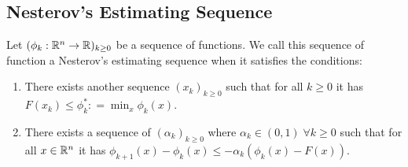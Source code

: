 \documentclass[12pt]{article}
\begin{document}
    \subsection{Nesterov's Estimating Sequence}
        \begin{definition}\label{def:nes-est-seq}
            Let $(\phi_k : \mathbb R^n \rightarrow\mathbb R)_{k \ge 0}$ be a sequence of functions. 
            We call this sequence of function a Nesterov's estimating sequence when it satisfies the conditions: 
            \begin{enumerate}
                \item There exists another sequence $(x_k)_{k \ge 0}$ such that for all $k \ge 0$ it has $F(x_k) \le \phi_k^*: =\min_{x}\phi_k(x)$. 
                \item There exists a sequence of $(\alpha_k)_{k \ge 0}$ where $\alpha_k \in (0, 1)\; \forall k \ge0 $ such that for all $x \in \mathbb R^n$ it has $\phi_{k + 1}(x) - \phi_k(x) \le - \alpha_k(\phi_k(x) - F(x))$. 
            \end{enumerate}
        \end{definition}
\end{document}
